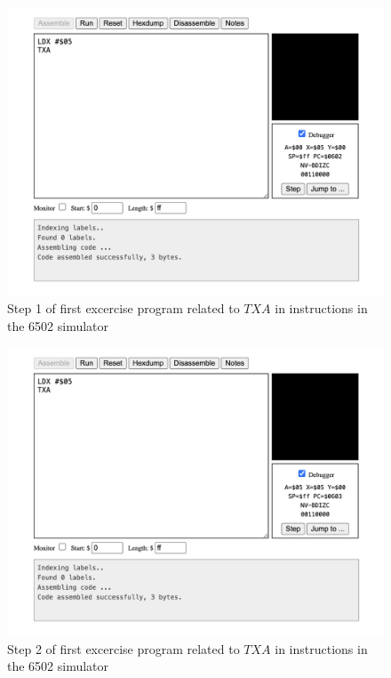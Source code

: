 \documentclass[a4paper]{article}
\begin{document}
\begin{figure}[H]
    \centering
    \includegraphics[width=1.0\textwidth]{res/images/q2/19-ex1-2-step1.png}
    \caption{Step 1 of first excercise program related to $TXA$ in instructions in the 6502 simulator}
    \label{fig:19-ex1-2-step1}
\end{figure}

\begin{figure}[H]
    \centering
    \includegraphics[width=1.0\textwidth]{res/images/q2/20-ex1-2-step2.png}
    \caption{Step 2 of first excercise program related to $TXA$ in instructions in the 6502 simulator}
    \label{fig:20-ex1-2-step2}
\end{figure}
\end{document}
